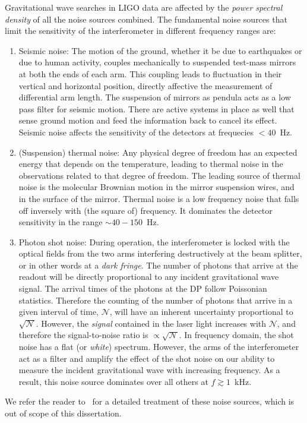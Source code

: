 Gravitational wave searches in LIGO data are affected by the {\it power
spectral density} of all the noise sources combined. The fundamental noise 
sources that limit the sensitivity of the interferometer in different frequency
ranges are:
% 
\begin{enumerate}
 \item Seismic noise:
 The motion of the ground, whether it be due to earthquakes or due to human 
 activity, couples mechanically to suspended test-mass mirrors at both the ends
 of each arm. This coupling leads to fluctuation in their vertical and horizontal
 position, directly affective the measurement of differential arm length.
 The suspension of mirrors as pendula acts as a low pass filter for seismic
 motion. There are active systems in place as well that sense ground motion and 
 feed the information back to cancel its effect. Seismic noise affects the 
 sensitivity of the detectors at frequecies  $< 40$~Hz.
 \item (Suspension) thermal noise:
 Any physical degree of freedom has an expected energy that depends on the temperature,
 leading to thermal noise in the observations related to that degree of freedom.
 The leading source of thermal noise is the molecular Brownian motion in the
 mirror suspension wires, and in the surface of the mirror. Thermal noise is 
 a low frequency noise that falls off inversely with (the square of) frequency. 
 It dominates  the detector sensitivity in the range $\sim 40-150$~Hz.
 \item Photon shot noise:
 During operation, the interferometer is locked 
 with the optical fields from the two arms interfering destructively at the
 beam splitter, or in other words at a {\it dark fringe}. The number of photons
 that arrive at the readout will be directly proportional to any incident
 gravitational wave signal. The arrival times of the photons at the DP 
 follow Poissonian statistics. Therefore the counting of the number of
 photons that arrive in a given interval of time, $\mathcal{N}$, will have an 
 inherent uncertainty proportional to $\sqrt{\mathcal{N}}$. However, the {\it signal}
 contained in the laser light increases with $\mathcal{N}$, and therefore the 
 signal-to-noise ratio is $\propto \sqrt{\mathcal{N}}$.
 In frequency domain, the shot noise has a flat (or {\it white}) spectrum. 
 However, the arms of the interferometer act as a filter and amplify the effect
 of the shot noise on our ability to measure the incident gravitational wave
 with increasing frequency. As a result, this noise source dominates over all
 others at $f\gtrsim 1$~kHz.
\end{enumerate}
% 
We refer the reader to~\cite{Saulson:1995zi} for a detailed treatment of these
noise sources, which is out of scope of this dissertation. 


